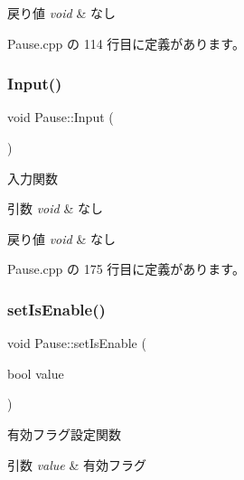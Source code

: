 \begin{DoxyRetVals}{戻り値}
{\em void} & なし \\
\hline
\end{DoxyRetVals}


 Pause.\+cpp の 114 行目に定義があります。

\mbox{\label{class_pause_a7a5bc88c879edac4ae9144b7cb6b1d2f}} 
\subsubsection{\texorpdfstring{Input()}{Input()}}
{\footnotesize\ttfamily void Pause\+::\+Input (\begin{DoxyParamCaption}{ }\end{DoxyParamCaption})\hspace{0.3cm}{\ttfamily [private]}}



入力関数 


\begin{DoxyParams}{引数}
{\em void} & なし \\
\hline
\end{DoxyParams}

\begin{DoxyRetVals}{戻り値}
{\em void} & なし \\
\hline
\end{DoxyRetVals}


 Pause.\+cpp の 175 行目に定義があります。

\mbox{\label{class_pause_abdc2f8eb5a953b807d95b15529b82ac1}} 
\subsubsection{\texorpdfstring{set\+Is\+Enable()}{setIsEnable()}}
{\footnotesize\ttfamily void Pause\+::set\+Is\+Enable (\begin{DoxyParamCaption}\item[{bool}]{value }\end{DoxyParamCaption})}



有効フラグ設定関数 


\begin{DoxyParams}{引数}
{\em value} & 有効フラグ \\
\hline
\end{DoxyParams}


